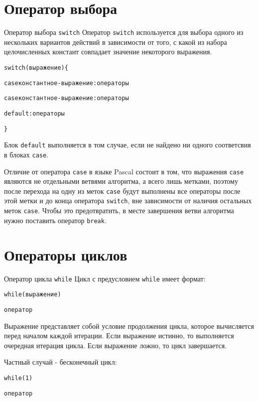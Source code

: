\documentclass[xcolor=table]{beamer}
\begin{document}
\section{Оператор выбора}

\begin{frame}{Оператор выбора \texttt{switch}}
    Оператор \texttt{switch} используется для выбора одного из нескольких вариантов действий в зависимости от того, с какой из набора целочисленных констант совпадает значение некоторого выражения.
    \begin{alltt}
        switch (выражение)\{
        
        \qquad case константное-выражение: операторы
        
        \qquad case константное-выражение: операторы
        
        \qquad default: операторы
        
        \}
    \end{alltt}
    
    Блок \texttt{default} выполняется в том случае, если не найдено ни одного соответсвия в блоках \texttt{case}.
    
    Отличие от оператора \texttt{case} в языке Pascal состоит в том, что выражения \texttt{case} являются не отдельными ветвями алгоритма, а всего лишь метками, поэтому после перехода на одну из меток \texttt{case} будут выполнены все операторы после этой метки и до конца оператора \texttt{switch}, вне зависимости от наличия остальных меток \texttt{case}. Чтобы это предотвратить, в месте завершения ветви алгоритма нужно поставить оператор \texttt{break}.
\end{frame}

\section{Операторы циклов}

\begin{frame}{Оператор цикла \texttt{while}}
    Цикл с предусловием \texttt{while} имеет формат:
    \begin{alltt}
        while (выражение)
            
        \qquad оператор
    \end{alltt}
    
    Выражение представляет собой условие продолжения цикла, которое вычисляется перед началом каждой итерации. Если выражение истинно, то выполняется очередная итерация цикла. Если выражение ложно, то цикл завершается.
    
    Частный случай - бесконечный цикл:
    \begin{alltt}
        while (1)
            
        \qquad оператор
    \end{alltt}
\end{frame}
\end{document}
